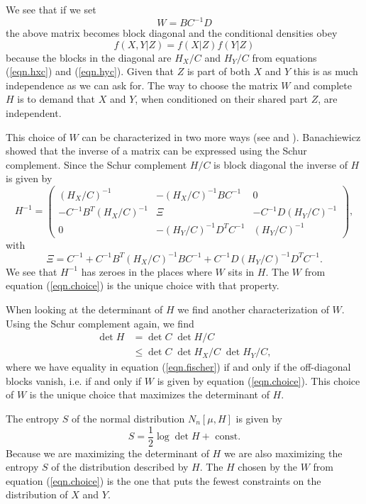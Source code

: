 \documentclass[11pt, a4paper]{article}
\begin{document}
We see that if we set
\begin{equation}\label{eqn.choice}
	W = BC^{-1}D
\end{equation}
the above matrix becomes block diagonal and the conditional densities obey
\begin{equation}\label{eqn.independent}
	f(X,Y\vert Z ) = f(X\vert Z)f(Y\vert Z)
\end{equation}
because the blocks in the diagonal are $H_X/C$ and $H_Y/C$ from equations (\ref{eqn.hxc}) and (\ref{eqn.hyc}). Given that $Z$ is part of both $X$ and $Y$ this is as much independence as we can ask for. The way to choose the matrix $W$ and complete $H$ is to demand that $X$ and $Y$, when conditioned on their shared part $Z$, are independent.

This choice of $W$ can be characterized in two more ways (see \cite{smith} and \cite{ksd}). Banachiewicz showed that the inverse of a matrix can be expressed using the Schur complement. Since the Schur complement $H/C$ is block diagonal the inverse of $H$ is given by
\begin{equation}
	H^{-1} = \begin{pmatrix}
		(H_X/C)^{-1} & -(H_X/C)^{-1} B C^{-1} & 0 \\
		- C^{-1} B^T (H_X/C)^{-1} & \Xi & - C^{-1} D (H_Y/C)^{-1} \\
		0 & - (H_Y/C)^{-1} D^T C^{-1} & (H_Y/C)^{-1} 
	\end{pmatrix},
\end{equation}
with
\begin{equation}
\Xi = C^{-1} + C^{-1} B^T (H_X/C)^{-1} B C^{-1} + C^{-1} D (H_Y/C)^{-1} D^T C^{-1}.
\end{equation}
We see that $H^{-1}$ has zeroes in the places where $W$ sits in $H$. The $W$ from equation (\ref{eqn.choice}) is the unique choice with that property.  

When looking at the determinant of $H$ we find another characterization of $W$. Using the Schur complement again, we find
\begin{align}
	\det H & = \det C \; \det H/C \\
	& \le \det C \; \det H_X/C \; \det H_Y/C,\label{eqn.fischer}
\end{align}
where we have equality in equation (\ref{eqn.fischer}) if and only if the off-diagonal blocks vanish, i.e. if and only if $W$ is given by equation (\ref{eqn.choice}). This choice of $W$ is the unique choice that maximizes the determinant of $H$.

The entropy $S$ of the normal distribution $N_n[\mu,H]$ is given by
\begin{equation}
	S = \frac{1}{2}\log \det H + \text{\ const.}
\end{equation} 
Because we are maximizing the determinant of $H$ we are also maximizing the entropy $S$ of the distribution described by $H$. The $H$ chosen by the $W$ from equation (\ref{eqn.choice}) is the one that puts the fewest constraints on the distribution of $X$ and $Y$. 
\end{document}

